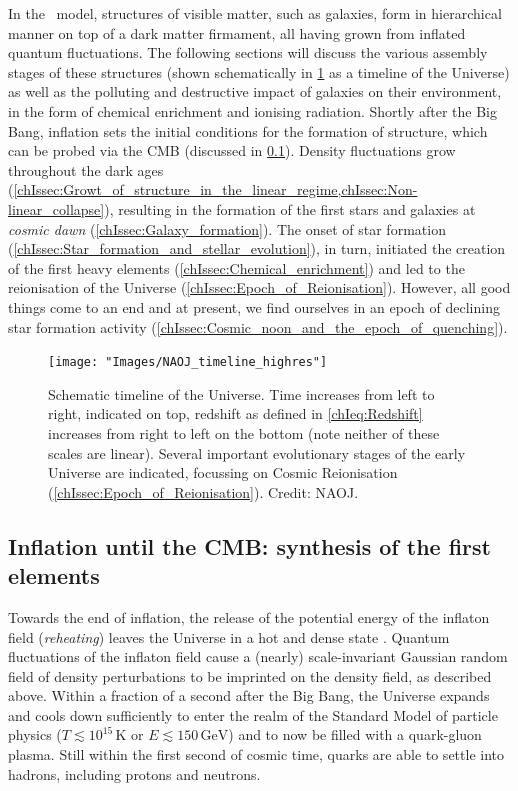 In the \LCDM\ model, structures of visible matter, such as galaxies, form in hierarchical manner on top of a dark matter firmament, all having grown from inflated quantum fluctuations. The following sections will discuss the various assembly stages of these structures (shown schematically in \cref{chIfig:Cosmic_timeline} as a timeline of the Universe) as well as the polluting and destructive impact of galaxies on their environment, in the form of chemical enrichment and ionising radiation. Shortly after the Big Bang, inflation sets the initial conditions for the formation of structure, which can be probed via the CMB (discussed in \cref{chIssec:Inflation_until_CMB}). Density fluctuations grow throughout the dark ages (\cref{chIssec:Growt_of_structure_in_the_linear_regime,chIssec:Non-linear_collapse}), resulting in the formation of the first stars and galaxies at \textit{cosmic dawn} (\cref{chIssec:Galaxy_formation}). The onset of star formation (\cref{chIssec:Star_formation_and_stellar_evolution}), in turn, initiated the creation of the first heavy elements (\cref{chIssec:Chemical_enrichment}) and led to the reionisation of the Universe (\cref{chIssec:Epoch_of_Reionisation}). However, all good things come to an end and at present, we find ourselves in an epoch of declining star formation activity (\cref{chIssec:Cosmic_noon_and_the_epoch_of_quenching}).
\begin{figure}
    \centering
    \texttt{[image: "Images/NAOJ\_timeline\_highres"]}
    \caption[Schematic timeline of the Universe.]{Schematic timeline of the Universe. Time increases from left to right, indicated on top, redshift as defined in \cref{chIeq:Redshift} increases from right to left on the bottom (note neither of these scales are linear). Several important evolutionary stages of the early Universe are indicated, focussing on Cosmic Reionisation (\cref{chIssec:Epoch_of_Reionisation}). Credit: NAOJ.}
    \label{chIfig:Cosmic_timeline}
\end{figure}

\subsection{Inflation until the CMB: synthesis of the first elements}
\label{chIssec:Inflation_until_CMB}

Towards the end of inflation, the release of the potential energy of the inflaton field (\textit{reheating}) leaves the Universe in a hot and dense state \citep[ultimately the source of the blackbody nature of the CMB;][]{1994PhRvL..73.3195K}. Quantum fluctuations of the inflaton field cause a (nearly) scale-invariant Gaussian random field of density perturbations to be imprinted on the density field, as described above. Within a fraction of a second after the Big Bang, the Universe expands and cools down sufficiently to enter the realm of the Standard Model of particle physics ($T \lesssim 10^{15} \, \mathrm{K}$ or $E \lesssim 150 \, \mathrm{GeV}$) and to now be filled with a quark-gluon plasma. Still within the first second of cosmic time, quarks are able to settle into hadrons, including protons and neutrons.

